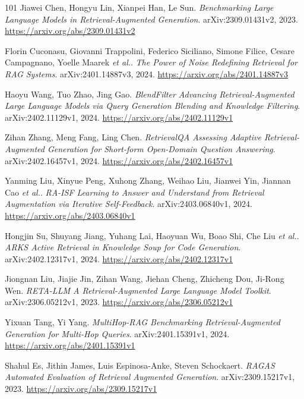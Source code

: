 \documentclass[11pt,a4paper]{article}
\begin{document}
\begin{thebibliography}{101}
Jiawei Chen, Hongyu Lin, Xianpei Han, Le Sun.
\newblock \emph{Benchmarking Large Language Models in Retrieval-Augmented Generation}.
\newblock arXiv:2309.01431v2, 2023.
\newblock \url{https://arxiv.org/abs/2309.01431v2}

Florin Cuconasu, Giovanni Trappolini, Federico Siciliano, Simone Filice, Cesare Campagnano, Yoelle Maarek \emph{et al.}.
\newblock \emph{The Power of Noise Redefining Retrieval for RAG Systems}.
\newblock arXiv:2401.14887v3, 2024.
\newblock \url{https://arxiv.org/abs/2401.14887v3}

Haoyu Wang, Tuo Zhao, Jing Gao.
\newblock \emph{BlendFilter Advancing Retrieval-Augmented Large Language Models via Query Generation Blending and Knowledge Filtering}.
\newblock arXiv:2402.11129v1, 2024.
\newblock \url{https://arxiv.org/abs/2402.11129v1}

Zihan Zhang, Meng Fang, Ling Chen.
\newblock \emph{RetrievalQA Assessing Adaptive Retrieval-Augmented Generation for Short-form Open-Domain Question Answering}.
\newblock arXiv:2402.16457v1, 2024.
\newblock \url{https://arxiv.org/abs/2402.16457v1}

Yanming Liu, Xinyue Peng, Xuhong Zhang, Weihao Liu, Jianwei Yin, Jiannan Cao \emph{et al.}.
\newblock \emph{RA-ISF Learning to Answer and Understand from Retrieval Augmentation via Iterative Self-Feedback}.
\newblock arXiv:2403.06840v1, 2024.
\newblock \url{https://arxiv.org/abs/2403.06840v1}

Hongjin Su, Shuyang Jiang, Yuhang Lai, Haoyuan Wu, Boao Shi, Che Liu \emph{et al.}.
\newblock \emph{ARKS Active Retrieval in Knowledge Soup for Code Generation}.
\newblock arXiv:2402.12317v1, 2024.
\newblock \url{https://arxiv.org/abs/2402.12317v1}

Jiongnan Liu, Jiajie Jin, Zihan Wang, Jiehan Cheng, Zhicheng Dou, Ji-Rong Wen.
\newblock \emph{RETA-LLM A Retrieval-Augmented Large Language Model Toolkit}.
\newblock arXiv:2306.05212v1, 2023.
\newblock \url{https://arxiv.org/abs/2306.05212v1}

Yixuan Tang, Yi Yang.
\newblock \emph{MultiHop-RAG Benchmarking Retrieval-Augmented Generation for Multi-Hop Queries}.
\newblock arXiv:2401.15391v1, 2024.
\newblock \url{https://arxiv.org/abs/2401.15391v1}

Shahul Es, Jithin James, Luis Espinosa-Anke, Steven Schockaert.
\newblock \emph{RAGAS Automated Evaluation of Retrieval Augmented Generation}.
\newblock arXiv:2309.15217v1, 2023.
\newblock \url{https://arxiv.org/abs/2309.15217v1}


\end{thebibliography}
\end{document}
